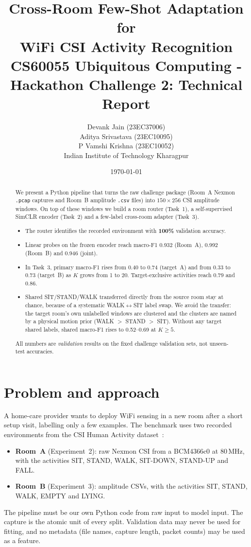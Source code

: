 \documentclass[11pt,a4paper]{article}
\title{\textbf{Cross-Room Few-Shot Adaptation for\\WiFi CSI Activity Recognition}\\[4pt]
\large CS60055 Ubiquitous Computing - Hackathon Challenge 2: Technical Report}
\author{%
  Devank Jain (23EC37006) \\
  Aditya Srivastava (23EC10095) \\
  P Vamshi Krishna (23EC10052) \\[4pt]
  Indian Institute of Technology Kharagpur%
}
\date{\today}
\begin{document}
\maketitle

\begin{abstract}
We present a Python pipeline that turns the raw challenge package (Room~A Nexmon \texttt{.pcap} captures and Room~B amplitude \texttt{.csv} files) into $150\times256$ CSI amplitude windows. On top of these windows we build a room router (Task~1), a self-supervised SimCLR encoder (Task~2) and a few-label cross-room adapter (Task~3).
\begin{itemize}
  \item The router identifies the recorded environment with \textbf{100\%} validation accuracy.
  \item Linear probes on the frozen encoder reach macro-F1 0.932 (Room~A), 0.992 (Room~B) and 0.946 (joint).
  \item In Task~3, primary macro-F1 rises from 0.40 to 0.74 (target~A) and from 0.33 to 0.73 (target~B) as $K$ grows from 1 to 20. Target-exclusive activities reach 0.79 and 0.86.
  \item Shared SIT/STAND/WALK transferred directly from the source room stay at chance, because of a systematic WALK$\leftrightarrow$SIT label swap. We avoid the transfer: the target room's own unlabelled windows are clustered and the clusters are named by a physical motion prior (WALK $>$ STAND $>$ SIT). Without any target shared labels, shared macro-F1 rises to 0.52--0.69 at $K\ge5$.
\end{itemize}
All numbers are \emph{validation} results on the fixed challenge validation sets, not unseen-test accuracies.
\end{abstract}

\section{Problem and approach}

A home-care provider wants to deploy WiFi sensing in a new room after a short setup visit, labelling only a few examples. The benchmark uses two recorded environments from the CSI Human Activity dataset~\cite{dataport,schafer}:
\begin{itemize}
  \item \textbf{Room~A} (Experiment~2): raw Nexmon CSI from a BCM4366c0 at 80\,MHz, with the activities SIT, STAND, WALK, SIT-DOWN, STAND-UP and FALL.
  \item \textbf{Room~B} (Experiment~3): amplitude CSVs, with the activities SIT, STAND, WALK, EMPTY and LYING.
\end{itemize}
The pipeline must be our own Python code from raw input to model input. The capture is the atomic unit of every split. Validation data may never be used for fitting, and no metadata (file names, capture length, packet counts) may be used as a feature.
\end{document}
